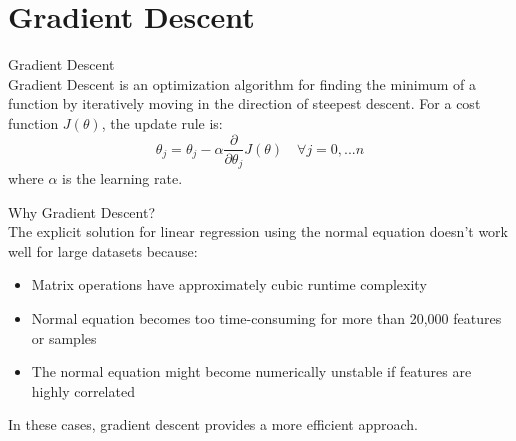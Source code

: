 \section{Gradient Descent}


\begin{definition}{Gradient Descent}\\
Gradient Descent is an optimization algorithm for finding the minimum of a function by iteratively moving in the direction of steepest descent. For a cost function $J(\theta)$, the update rule is:
\[\theta_j = \theta_j - \alpha \frac{\partial}{\partial\theta_j}J(\theta) \quad \forall j = 0,...n\]
where $\alpha$ is the learning rate.
\end{definition}

\begin{concept}{Why Gradient Descent?}\\
The explicit solution for linear regression using the normal equation doesn't work well for large datasets because:
\begin{itemize}
    \item Matrix operations have approximately cubic runtime complexity
    \item Normal equation becomes too time-consuming for more than 20,000 features or samples
    \item The normal equation might become numerically unstable if features are highly correlated
\end{itemize}
In these cases, gradient descent provides a more efficient approach.
\end{concept}

